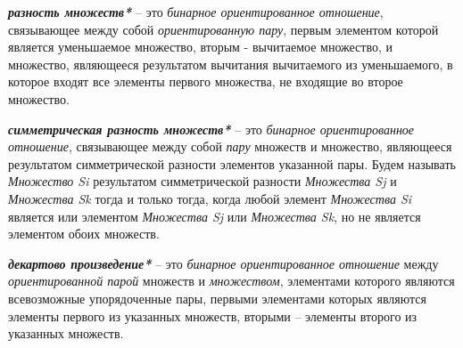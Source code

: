 \begin{SCn}
\end{SCn}

\textbf{\textit{разность множеств*}} – это \textit{бинарное ориентированное отношение}, связывающее между собой \textit{ориентированную пару}, первым элементом которой является уменьшаемое множество, вторым - вычитаемое множество, и множество, являющееся результатом вычитания вычитаемого из уменьшаемого, в которое входят все элементы первого множества, не входящие во второе множество.

\begin{SCn}
\end{SCn}

\textbf{\textit{симметрическая разность множеств*}} – это \textit{бинарное ориентированное отношение}, связывающее между собой \textit{пару} множеств и множество, являющееся результатом симметрической разности элементов указанной пары. Будем называть \textit{Множество Si} результатом симметрической разности \textit{Множества Sj} и \textit{Множества Sk} тогда и только тогда, когда любой элемент \textit{Множества Si} является или элементом \textit{Множества Sj} или \textit{Множества Sk}, но не является элементом обоих множеств.

\begin{SCn}
\end{SCn}

\textbf{\textit{декартово произведение*}} – это \textit{бинарное ориентированное отношение} между \textit{ориентированной парой} множеств и \textit{множеством}, элементами которого являются всевозможные упорядоченные пары, первыми элементами которых являются элементы первого из указанных множеств, вторыми – элементы второго из указанных множеств.

